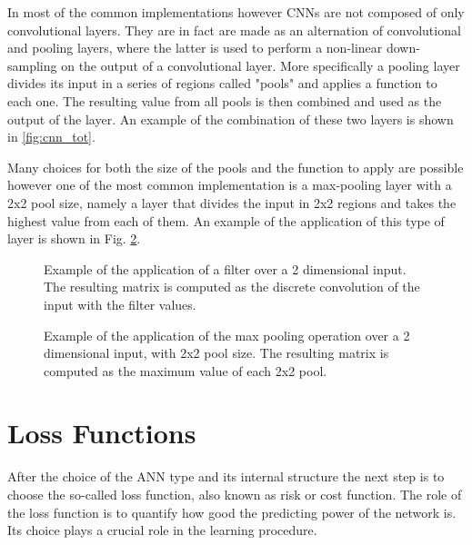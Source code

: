 \documentclass[../../main.tex]{subfiles}
\begin{document}
In most of the common implementations however CNNs are not composed of only convolutional layers. They are in fact are made as an alternation of convolutional and pooling layers, where the latter is used to  perform a non-linear down-sampling on the output of a convolutional layer. 
More specifically a pooling layer divides its input in a series of regions called "pools" and applies a function to each one.
The resulting value from all pools is then combined and used as the output of the layer.
An example of the combination of these two layers is shown in \ref{fig:cnn_tot}.

Many choices for both the size of the pools and the function to apply are possible however one of the most common implementation is a max-pooling layer with a 2x2 pool size, namely a layer that divides the input in 2x2 regions and takes the highest value from each of them. An example of the application of this type of layer is shown in Fig. \ref{fig:cnn_pool}. 

\begin{figure}[h]
    \centering
    
    \caption{Example of the application of a filter over a 2 dimensional input. The resulting matrix is computed as the discrete convolution of the input with the filter values.}
    \label{fig:cnn_filter}
\end{figure}

\begin{figure}[h]
    \centering
    \caption{Example of the application of the max pooling operation over a 2 dimensional input, with 2x2 pool size. The resulting matrix is computed as the maximum value of each 2x2 pool.}
    \label{fig:cnn_pool}
\end{figure}


%  
  
\section{Loss Functions}
\label{sec:NN_loss}

After the choice of the ANN type and its internal structure the next step is to choose the so-called loss function, also known as risk or cost function\cite{lossfunc}. The role of the loss function is to quantify how good the predicting power of the network is. Its choice plays a crucial role in the learning procedure.  
\end{document}
